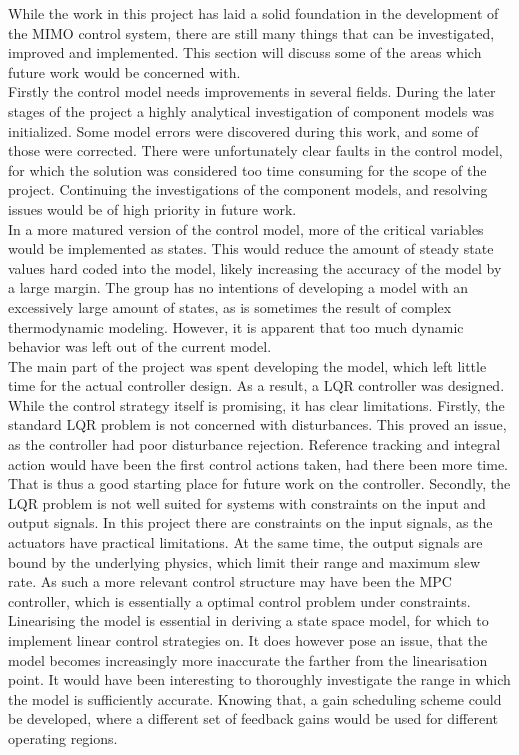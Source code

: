 While the work in this project has laid a solid foundation in the development of the MIMO control system, there are still many things that can be investigated, improved and implemented. This section will discuss some of the areas which future work would be concerned with.\\

Firstly the control model needs improvements in several fields. During the later stages of the project a highly analytical investigation of component models was initialized. Some model errors were discovered during this work, and some of those were corrected. There were unfortunately clear faults in the control model, for which the solution was considered too time consuming for the scope of the project. Continuing the investigations of the component models, and resolving issues would be of high priority in future work. \\

In a more matured version of the control model, more of the critical variables would be implemented as states. This would reduce the amount of steady state values hard coded into the model, likely increasing the accuracy of the model by a large margin. The group has no intentions of developing a model with an excessively large amount of states, as is sometimes the result of complex thermodynamic modeling. However, it is apparent that too much dynamic behavior was left out of the current model.\\

The main part of the project was spent developing the model, which left little time for the actual controller design. As a result, a LQR controller was designed. While the control strategy itself is promising, it has clear limitations. Firstly, the standard LQR problem is not concerned with disturbances. This proved an issue, as the controller had poor disturbance rejection. Reference tracking and integral action would have been the first control actions taken, had there been more time. That is thus a good starting place for future work on the controller. Secondly, the LQR problem is not well suited for systems with constraints on the input and output signals. In this project there are constraints on the input signals, as the actuators have practical limitations. At the same time, the output signals are bound by the underlying physics, which limit their range and maximum slew rate. As such a more relevant control structure may have been the MPC controller, which is essentially a optimal control problem under constraints.\\

Linearising the model is essential in deriving a state space model, for which to implement linear control strategies on. It does however pose an issue, that the model becomes increasingly more inaccurate the farther from the linearisation point. It would have been interesting to thoroughly investigate the range in which the model is sufficiently accurate. Knowing that, a gain scheduling scheme could be developed, where a different set of feedback gains would be used for different operating regions. 